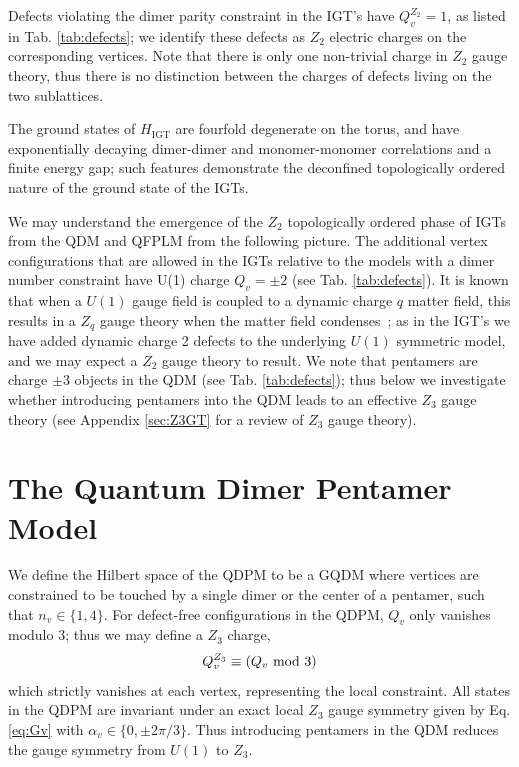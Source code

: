 \documentclass[twocolumn,prb,aps,floatfix,superscriptaddress]{revtex4-1}
\newcommand{\tabref}[1]{Tab. \ref{#1}}
\newcommand{\appref}[1]{Appendix \ref{#1}}
\newcommand{\Eqref}[1]{Eq. \eqref{#1}}
\newcommand{\HIGT}{H_\mathrm{IGT}}
\begin{document}
Defects violating the dimer parity constraint in the IGT's have $Q_v^{Z_2} = 1$, as listed in \tabref{tab:defects}; we identify these defects as $Z_2$ electric charges on the corresponding vertices. Note that there is only one non-trivial charge in $Z_2$ gauge theory, thus there is no distinction between the charges of defects living on the two sublattices.

The ground states of $\HIGT$ are fourfold degenerate on the torus, and have exponentially decaying dimer-dimer and monomer-monomer correlations and a finite energy gap; such features demonstrate the deconfined topologically ordered nature of the ground state of the IGTs.

We may understand the emergence of the $Z_2$ topologically ordered phase of IGTs from the QDM and QFPLM from the following picture. The additional vertex configurations that are allowed in the IGTs relative to the models with a dimer number constraint  have U(1) charge $Q_v = \pm 2$ (see \tabref{tab:defects}). It is known that when a $U(1)$ gauge field is coupled to a dynamic charge $q$ matter field, this results in a $Z_q$ gauge theory when the matter field condenses~\cite{Fradkin1979}; as in the IGT's we have added dynamic charge 2 defects to the underlying $U(1)$ symmetric model, and we may expect a $Z_2$ gauge theory to result. We note that pentamers are charge $\pm3$ objects in the QDM (see \tabref{tab:defects}); thus below we investigate whether introducing pentamers into the QDM leads to an effective $Z_3$ gauge theory (see \appref{sec:Z3GT} for a review of $Z_3$ gauge theory).


\section{The Quantum Dimer Pentamer Model}
\label{sec:QDPM}

We define the Hilbert space of the QDPM to be a GQDM where vertices are constrained to be touched by a single dimer or the center of a pentamer, such that $n_v \in \{1,4\}$. For defect-free configurations in the QDPM, $Q_v$ only vanishes modulo $3$;  thus we may define a $Z_3$ charge,
\begin{equation}
Q_v^{Z_3} \equiv \left(Q_v~\rm{mod}~3\right)
\end{equation}
 which strictly vanishes at each vertex, representing the local constraint. All states in the QDPM are invariant under an exact local $Z_3$ gauge symmetry given by \Eqref{eq:Gv} with $\alpha_v \in \{0,\pm 2\pi/3\}$. Thus introducing pentamers in the QDM reduces the gauge symmetry from $U(1)$ to $Z_3$.
\end{document}
